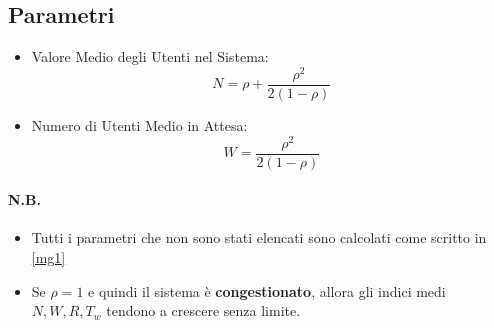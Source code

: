 \subsection{Parametri}

\begin{itemize}
    \item Valore Medio degli Utenti nel Sistema: $$N = \rho + \frac{\rho^2}{2 (1-\rho)}$$
    \item Numero di Utenti Medio in Attesa: $$W = \frac{\rho^2}{2(1-\rho)}$$
\end{itemize}

\paragraph{N.B.}
\begin{itemize}
    \item Tutti i parametri che non sono stati elencati sono calcolati come scritto in \ref{mg1}
    \item Se $\rho = 1$ e quindi il sistema è \textbf{congestionato}, allora gli
          indici medi $N, W, R, T_w$ tendono a crescere senza limite.
\end{itemize}